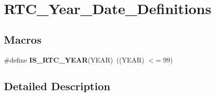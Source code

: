 \hypertarget{group___r_t_c___year___date___definitions}{}\section{R\+T\+C\+\_\+\+Year\+\_\+\+Date\+\_\+\+Definitions}
\label{group___r_t_c___year___date___definitions}
\subsection*{Macros}
\begin{DoxyCompactItemize}
\item 
\hypertarget{group___r_t_c___year___date___definitions_gae59c9cfe6f9532ab26d74c25bcbe814b}{}\#define {\bfseries I\+S\+\_\+\+R\+T\+C\+\_\+\+Y\+E\+A\+R}(Y\+E\+A\+R)~((Y\+E\+A\+R) $<$= 99)\label{group___r_t_c___year___date___definitions_gae59c9cfe6f9532ab26d74c25bcbe814b}

\end{DoxyCompactItemize}


\subsection{Detailed Description}
